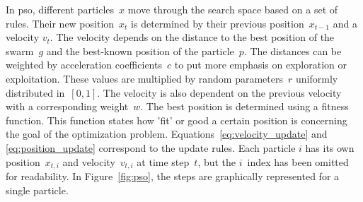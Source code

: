 In \gls{pso}, different particles~$x$ move through the search space based on a set of rules. Their new position~$x_t$ is determined by their previous position~$x_{t-1}$ and a velocity $v_t$. The velocity depends on the distance to the best position of the swarm~$g$ and the best-known position of the particle~$p$. The distances can be weighted by acceleration coefficients~$c$ to put more emphasis on exploration or exploitation. These values are multiplied by random parameters~$r$ uniformly distributed in~$[0,1]$. The velocity is also dependent on the previous velocity with a corresponding weight~$w$. The best position is determined using a fitness function. This function states how 'fit' or good a certain position is concerning the goal of the optimization problem. Equations~\ref{eq:velocity_update} and \ref{eq:position_update} correspond to the update rules. Each particle $i$ has its own position~$x_{t,i}$ and velocity~$v_{t,i}$ at time step~$t$, but the $i$~index has been omitted for readability. In Figure~\ref{fig:pso}, the steps are graphically represented for a single particle.

